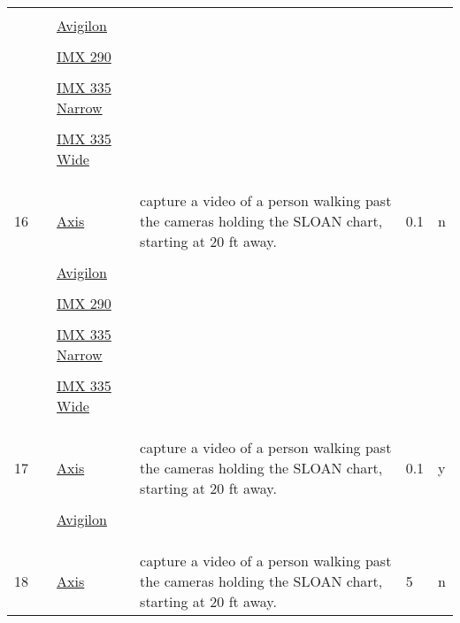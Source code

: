 \documentclass{article}%
\begin{document}
\begin{longtabu}{m{2.5cm} m{4cm} m{2cm} m{4cm} m{2cm} m{2cm}}
&&&&&\\%
&&\href{https://drive.google.com/file/d/1yncIOssxeyLSLnh9IjlnnUIgVwEovYzE/view?usp=sharing}{Avigilon}&&&\\%
&&&&&\\%
&&\href{}{IMX 290}&&&\\%
&&&&&\\%
&&\href{}{IMX 335 Narrow}&&&\\%
&&&&&\\%
&&\href{}{IMX 335 Wide}&&&\\%
&&&&&\\%
&&&&&\\%
\hline%
&&&&&\\%
16&&\href{https://drive.google.com/file/d/1ARh3PP_oWMajqsPB_AXcx6RZX3jFzKOB/view?usp=sharing}{Axis}&capture a video of a person walking past the cameras holding the SLOAN chart, starting at 20 ft away.&0.1&n\\%
&&&&&\\%
&&\href{https://drive.google.com/file/d/18Ho9aJrwcuCO7JGJaULrZLrZ4AxPu1tK/view?usp=sharing}{Avigilon}&&&\\%
&&&&&\\%
&&\href{https://drive.google.com/file/d/1keSs6z4fy486AVA5HE6J0QysqZOWFrXD/view?usp=sharing}{IMX 290}&&&\\%
&&&&&\\%
&&\href{https://drive.google.com/file/d/16Bf-A20tSQrS3tqmgbiYGsilQzk9jIiK/view?usp=sharing}{IMX 335 Narrow}&&&\\%
&&&&&\\%
&&\href{https://drive.google.com/file/d/1wWRmYteOcu1JBK_WTod943ItaNdNcF58/view?usp=sharing}{IMX 335 Wide}&&&\\%
&&&&&\\%
&&&&&\\%
\hline%
&&&&&\\%
17&&\href{https://drive.google.com/file/d/1lbnZEWrkW8z4IXsYOgWSA9GNEzcKqZNb/view?usp=sharing}{Axis}&capture a video of a person walking past the cameras holding the SLOAN chart, starting at 20 ft away.&0.1&y\\%
&&&&&\\%
&&\href{https://drive.google.com/file/d/1342uopU2EbLuZx73gg2TI6-ExcB4aZP0/view?usp=sharing}{Avigilon}&&&\\%
&&&&&\\%
&&&&&\\%
\hline%
&&&&&\\%
18&&\href{https://drive.google.com/file/d/1GN1A2vdZTWRAQqDle7vwZkvldw-dV6Hx/view?usp=sharing}{Axis}&capture a video of a person walking past the cameras holding the SLOAN chart, starting at 20 ft away.&5&n\\%

\end{longtabu}
\end{document}

